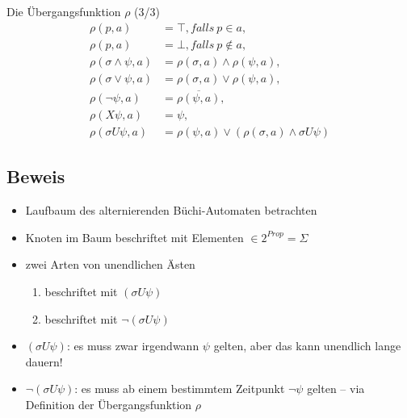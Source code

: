\begin{frame}{\insertsubsection}
\begin{block}{Die Übergangsfunktion $\rho$ (3/3)}
    \vspace*{-1em}
    \begin{equation*}
    \label{aba-zu-ltl:transitionsfunktion}
    \begin{split}
        \rho(p, a) &= \top, falls \ p \in a,\\
        \rho(p, a) &= \bot, falls \ p \not\in a,\\
        \rho(\sigma \land \psi, a) &= \rho(\sigma, a) \land \rho(\psi, a),\\
        \rho(\sigma \lor \psi, a) &= \rho(\sigma, a) \lor \rho(\psi, a),\\
        \rho(\lnot\psi, a) &= \overline{\rho(\psi, a)},\\
        \rho(X\psi, a) &= \psi,\\
        \rho(\sigma U\psi, a) &= \rho(\psi, a) \lor (\rho(\sigma, a) \land \sigma U\psi)
    \end{split}
    \end{equation*}
\end{block}
\end{frame}

\subsection{Beweis}
\begin{frame}{\insertsubsection}
\begin{itemize}
    \item Laufbaum des alternierenden Büchi-Automaten betrachten
    \item Knoten im Baum beschriftet mit Elementen $\in 2^{Prop} = \Sigma$
    \pause
    \item zwei Arten von unendlichen Ästen
    \begin{enumerate}
        \item beschriftet mit $(\sigma U\psi)$
        \item beschriftet mit $\lnot(\sigma U\psi)$
    \end{enumerate}
    \pause
    \item $(\sigma U\psi)$: es muss zwar irgendwann $\psi$ gelten, aber das kann unendlich lange dauern!
    \item $\lnot(\sigma U\psi)$: es muss ab einem bestimmtem Zeitpunkt $\lnot\psi$ gelten -- via Definition der Übergangsfunktion $\rho$
\end{itemize}
\end{frame}

